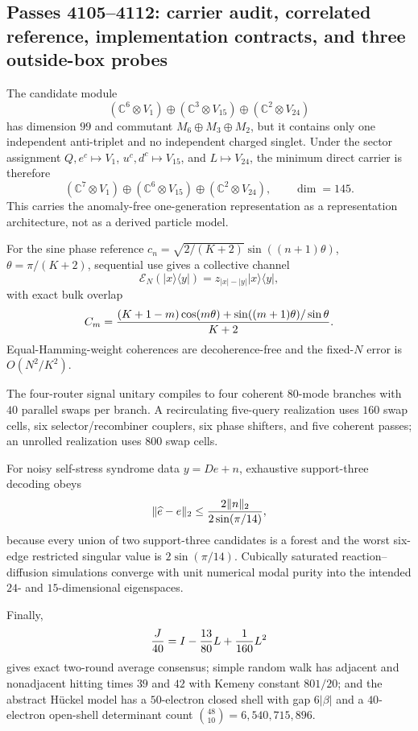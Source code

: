\subsection*{Passes 4105--4112: carrier audit, correlated reference, implementation contracts, and three outside-box probes}
The candidate module
\[
(\mathbb C^6\!\otimes V_1)\oplus(\mathbb C^3\!\otimes V_{15})\oplus(\mathbb C^2\!\otimes V_{24})
\]
has dimension $99$ and commutant $M_6\oplus M_3\oplus M_2$, but it contains only one independent anti-triplet and no independent charged singlet.  Under the sector assignment $Q,e^c\mapsto V_1$, $u^c,d^c\mapsto V_{15}$, and $L\mapsto V_{24}$, the minimum direct carrier is therefore
\[
(\mathbb C^7\!\otimes V_1)\oplus(\mathbb C^6\!\otimes V_{15})\oplus(\mathbb C^2\!\otimes V_{24}),
\qquad \dim=145.
\]
This carries the anomaly-free one-generation representation as a representation architecture, not as a derived particle model.

For the sine phase reference $c_n=\sqrt{2/(K+2)}\sin((n+1)\theta)$, $\theta=\pi/(K+2)$, sequential use gives a collective channel
\[
\mathcal E_N(|x\rangle\langle y|)=z_{|x|-|y|}|x\rangle\langle y|,
\]
with exact bulk overlap
\[
C_m={ (K+1-m)\cos(m\theta)+\sin((m+1)\theta)/\sin\theta\over K+2}.
\]
Equal-Hamming-weight coherences are decoherence-free and the fixed-$N$ error is $O(N^2/K^2)$.

The four-router signal unitary compiles to four coherent $80$-mode branches with $40$ parallel swaps per branch.  A recirculating five-query realization uses $160$ swap cells, six selector/recombiner couplers, six phase shifters, and five coherent passes; an unrolled realization uses $800$ swap cells.

For noisy self-stress syndrome data $y=De+n$, exhaustive support-three decoding obeys
\[
\|\widehat e-e\|_2\le {2\|n\|_2\over 2\sin(\pi/14)},
\]
because every union of two support-three candidates is a forest and the worst six-edge restricted singular value is $2\sin(\pi/14)$.  Cubically saturated reaction--diffusion simulations converge with unit numerical modal purity into the intended $24$- and $15$-dimensional eigenspaces.

Finally,
\[
{J\over40}=I-{13\over80}L+{1\over160}L^2
\]
gives exact two-round average consensus; simple random walk has adjacent and nonadjacent hitting times $39$ and $42$ with Kemeny constant $801/20$; and the abstract H\"uckel model has a $50$-electron closed shell with gap $6|\beta|$ and a $40$-electron open-shell determinant count $\binom{48}{10}=6{,}540{,}715{,}896$.
